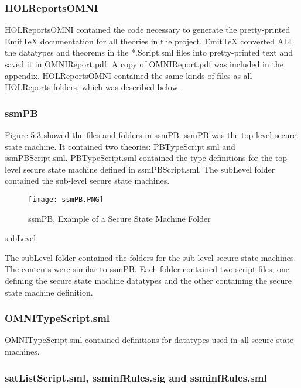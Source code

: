 \subsubsection{HOLReportsOMNI}
\label{sec:holreportsomni-1}


HOLReportsOMNI contained the code necessary to generate the pretty-printed EmitTeX
documentation for all theories in the project.  EmitTeX converted ALL the datatypes
and theorems in the *.Script.sml files into pretty-printed text and saved it in
OMNIReport.pdf.  A copy of OMNIReport.pdf was included in the appendix.  HOLReportsOMNI
contained the same kinds of files as all HOLReports folders, which was described below.  


\subsubsection{ssmPB}
\label{sec:ssmpb-1}


Figure 5.3 showed the files and folders in ssmPB.  ssmPB was the top-level secure
state machine.  It contained two theories: PBTypeScript.sml and ssmPBScript.sml.
PBTypeScript.sml contained the type definitions for the top-level secure state machine
defined in ssmPBScript.sml.  The subLevel folder contained the sub-level secure state machines.

\begin{figure}[h]
  \centering
  \texttt{[image: ssmPB.PNG]}
  \caption{ssmPB, Example of a Secure State Machine Folder}
\end{figure}

\underline{subLevel}


The subLevel folder contained the folders for the sub-level secure state machines.
The contents were similar to ssmPB.  Each folder contained two script files,
one defining the secure state machine datatypes and the other containing the
secure state machine definition.


\subsubsection{OMNITypeScript.sml}
\label{sec:omnitypescript.sml-1}


OMNITypeScript.sml contained definitions for datatypes used in all secure state machines.


\subsubsection{satListScript.sml, ssminfRules.sig and ssminfRules.sml}
\label{sec:satl-ssminfr-ssminfr-1}



